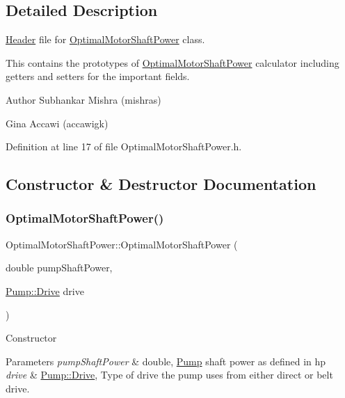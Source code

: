 \subsection{Detailed Description}
\hyperlink{class_header}{Header} file for \hyperlink{class_optimal_motor_shaft_power}{Optimal\+Motor\+Shaft\+Power} class. 

This contains the prototypes of \hyperlink{class_optimal_motor_shaft_power}{Optimal\+Motor\+Shaft\+Power} calculator including getters and setters for the important fields.

\begin{DoxyAuthor}{Author}
Subhankar Mishra (mishras) 

Gina Accawi (accawigk) 
\end{DoxyAuthor}


Definition at line 17 of file Optimal\+Motor\+Shaft\+Power.\+h.



\subsection{Constructor \& Destructor Documentation}
\mbox{\label{class_optimal_motor_shaft_power_a5b793114a451ef9fe7a29f9db9f44bb6}} 
\subsubsection{\texorpdfstring{Optimal\+Motor\+Shaft\+Power()}{OptimalMotorShaftPower()}}
{\footnotesize\ttfamily Optimal\+Motor\+Shaft\+Power\+::\+Optimal\+Motor\+Shaft\+Power (\begin{DoxyParamCaption}\item[{double}]{pump\+Shaft\+Power,  }\item[{\hyperlink{class_pump_a32bf0ade131a11bb3b3fb374f638e983}{Pump\+::\+Drive}}]{drive }\end{DoxyParamCaption})\hspace{0.3cm}{\ttfamily [inline]}}

Constructor 
\begin{DoxyParams}{Parameters}
{\em pump\+Shaft\+Power} & double, \hyperlink{class_pump}{Pump} shaft power as defined in hp \\
\hline
{\em drive} & \hyperlink{class_pump_a32bf0ade131a11bb3b3fb374f638e983}{Pump\+::\+Drive}, Type of drive the pump uses from either direct or belt drive. \\
\hline
\end{DoxyParams}


